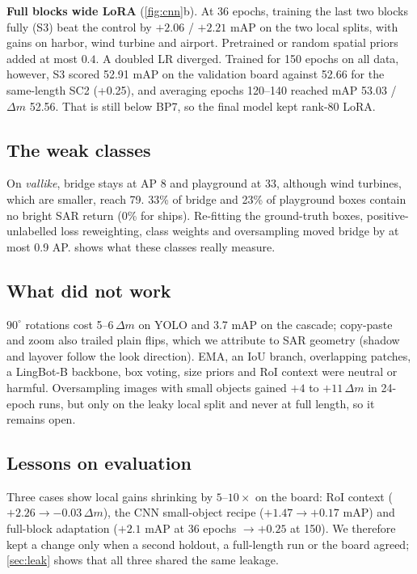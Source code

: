 \documentclass[10pt,twocolumn,letterpaper]{article}
\newcommand{\dm}{\ensuremath{\Delta m}}
\begin{document}
\textbf{Full blocks \vs wide LoRA} (\cref{fig:cnn}b). At 36 epochs, training the last two blocks fully (S3) beat the control by $+2.06$ / $+2.21$ mAP on the two local splits, with gains on harbor, wind turbine and airport. Pretrained or random spatial priors added at most $0.4$. A doubled LR diverged. Trained for 150 epochs on all data, however, S3 scored 52.91 mAP on the validation board against 52.66 for the same-length SC2 (+0.25), and averaging epochs 120--140 reached mAP 53.03 / \dm{} 52.56. That is still below BP7, so the final model kept rank-80 LoRA.

\subsection{The weak classes}
\label{sec:weak}
On \emph{vallike}, bridge stays at AP 8 and playground at 33, although wind turbines, which are smaller, reach 79. 33\% of bridge and 23\% of playground boxes contain no bright SAR return (0\% for ships). Re-fitting the ground-truth boxes, positive-unlabelled loss reweighting, class weights and oversampling moved bridge by at most 0.9 AP.  shows what these classes really measure.

\subsection{What did not work}
\label{sec:failed}
$90^\circ$ rotations cost 5--6\,\dm{} on YOLO and 3.7 mAP on the cascade; copy-paste and zoom also trailed plain flips, which we attribute to SAR geometry (shadow and layover follow the look direction). EMA, an IoU branch, overlapping patches, a LingBot-B backbone, box voting, size priors and RoI context were neutral or harmful. Oversampling images with small objects gained $+4$ to $+11$\,\dm{} in 24-epoch runs, but only on the leaky local split and never at full length, so it remains open.

\subsection{Lessons on evaluation}
\label{sec:lessons}
Three cases show local gains shrinking by $5$--$10\times$ on the board: RoI context ($+2.26\to-0.03$\,\dm), the CNN small-object recipe ($+1.47\to+0.17$ mAP) and full-block adaptation ($+2.1$ mAP at 36 epochs $\to+0.25$ at 150). We therefore kept a change only when a second holdout, a full-length run or the board agreed; \cref{sec:leak} shows that all three shared the same leakage.
\end{document}
